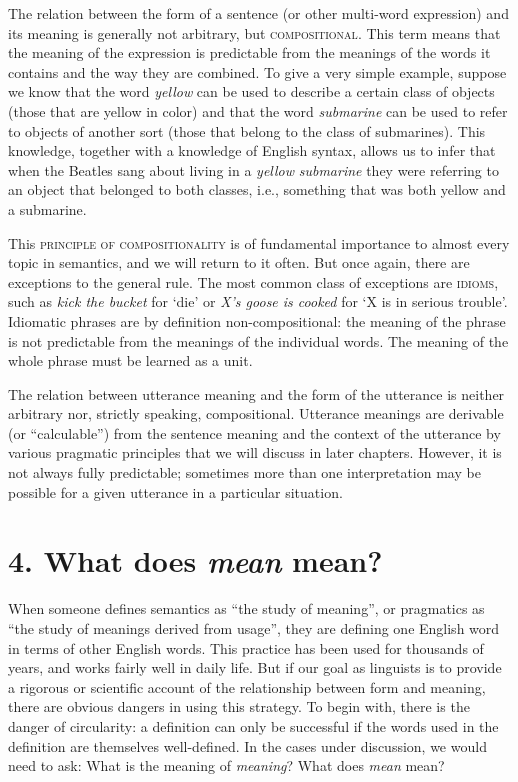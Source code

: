 The relation between the form of a sentence (or other multi-word expression) and its meaning is generally not arbitrary, but \textsc{compositional}. This term means that the meaning of the expression is predictable from the meanings of the words it contains and the way they are combined. To give a very simple example, suppose we know that the word \textit{yellow} can be used to describe a certain class of objects (those that are yellow in color) and that the word \textit{submarine} can be used to refer to objects of another sort (those that belong to the class of submarines). This knowledge, together with a knowledge of English syntax, allows us to infer that when the Beatles sang about living in a \textit{yellow} \textit{submarine} they were referring to an object that belonged to both classes, i.e., something that was both yellow and a submarine.



This \textsc{principle of compositionality} is of fundamental importance to almost every topic in semantics, and we will return to it often. But once again, there are exceptions to the general rule. The most common class of exceptions are \textsc{idioms}, such as \textit{kick the bucket} for ‘die’ or \textit{X’s goose is cooked} for ‘X is in serious trouble’. Idiomatic phrases are by definition non-compositional: the meaning of the phrase is not predictable from the meanings of the individual words. The meaning of the whole phrase must be learned as a unit.



The relation between utterance meaning and the form of the utterance is neither arbitrary nor, strictly speaking, compositional. Utterance meanings are derivable (or “calculable”) from the sentence meaning and the context of the utterance by various pragmatic principles that we will discuss in later chapters. However, it is not always fully predictable; sometimes more than one interpretation may be possible for a given utterance in a particular situation.


\section{4. What does \textit{mean} mean?}\label{sec:}

When someone defines semantics as “the study of meaning”, or pragmatics as “the study of meanings derived from usage”, they are defining one English word in terms of other English words. This practice has been used for thousands of years, and works fairly well in daily life. But if our goal as linguists is to provide a rigorous or scientific account of the relationship between form and meaning, there are obvious dangers in using this strategy. To begin with, there is the danger of circularity: a definition can only be successful if the words used in the definition are themselves well-defined. In the cases under discussion, we would need to ask: What is the meaning of \textit{meaning}? What does \textit{mean} mean?



